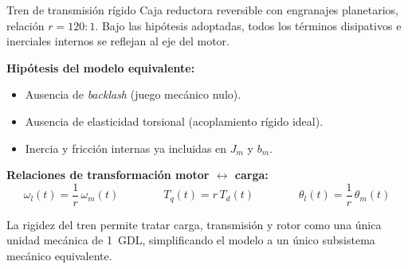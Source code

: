 \documentclass[aspectratio=169,t]{beamer}
\begin{document}
\begin{frame}{Tren de transmisión rígido}
{\small\color{uncGray}Caja reductora reversible con engranajes planetarios, relación $r=120{:}1$. Bajo las hipótesis adoptadas, todos los términos disipativos e inerciales internos se reflejan al eje del motor.}\par
\vspace{4mm}

\textbf{Hipótesis del modelo equivalente:}
\begin{itemize}
\item Ausencia de \textit{backlash} (juego mecánico nulo).
\item Ausencia de elasticidad torsional (acoplamiento rígido ideal).
\item Inercia y fricción internas ya incluidas en $J_m$ y $b_m$.
\end{itemize}

\vspace{4mm}
\textbf{Relaciones de transformación motor $\leftrightarrow$ carga:}
\begin{equation*}
\omega_l(t) = \frac{1}{r}\,\omega_m(t)
\qquad\qquad
T_q(t) = r\,T_d(t)
\qquad\qquad
\theta_l(t) = \frac{1}{r}\,\theta_m(t)
\end{equation*}

\vspace{4mm}
{\small La rigidez del tren permite tratar carga, transmisión y rotor como una única unidad mecánica de 1~GDL, simplificando el modelo a un único subsistema mecánico equivalente.}
\end{frame}
\end{document}
